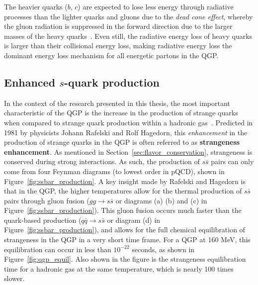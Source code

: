 The heavier quarks ($b$, $c$) are expected to lose less energy through radiative processes than the lighter quarks and gluons due to the \textit{dead cone effect}, whereby the gluon radiation is suppressed in the forward direction due to the larger masses of the heavy quarks~\cite{DeadCone}. Even still, the radiative energy loss of heavy quarks is larger than their collisional energy loss, making radiative energy loss the dominant energy loss mechanism for all energetic partons in the QGP.



\subsection{Enhanced $s$-quark production}
\label{sec:qgp_strangeness}

In the context of the research presented in this thesis, the most important characteristic of the QGP is the increase in the production of strange quarks when compared to strange quark production within a hadronic gas~\cite{Strangeness}. Predicted in 1981 by physicists Johann Rafelski and Rolf Hagedorn, this \textit{enhancement} in the production of strange quarks in the QGP is often referred to as \textbf{strangeness enhancement}. As mentioned in Section~\ref{sec:flavor_conservation}, strangeness is conserved during strong interactions. As such, the production of $s\bar{s}$ pairs can only come from four Feynman diagrams (to lowest order in pQCD), shown in Figure~\ref{fig:ssbar_production}. A key insight made by Rafelski and Hagedorn is that in the QGP, the higher temperatures allow for the thermal production of $s\bar{s}$ pairs through gluon fusion ($gg \rightarrow s\bar{s}$ or diagrams (a) (b) and (c) in Figure~\ref{fig:ssbar_production}). This gluon fusion occurs much faster than the quark-based production ($q\bar{q} \rightarrow s\bar{s}$ or diagram (d) in Figure~\ref{fig:ssbar_production}), and allows for the full chemical equilibration of strangeness in the QGP in a very short time frame. For a QGP at 160 MeV, this equilibration can occur in less than $10^{-22}$ seconds, as shown in Figure~\ref{fig:qgp_equil}. Also shown in the figure is the strangeness equilibration time for a hadronic gas at the same temperature, which is nearly 100 times slower.


